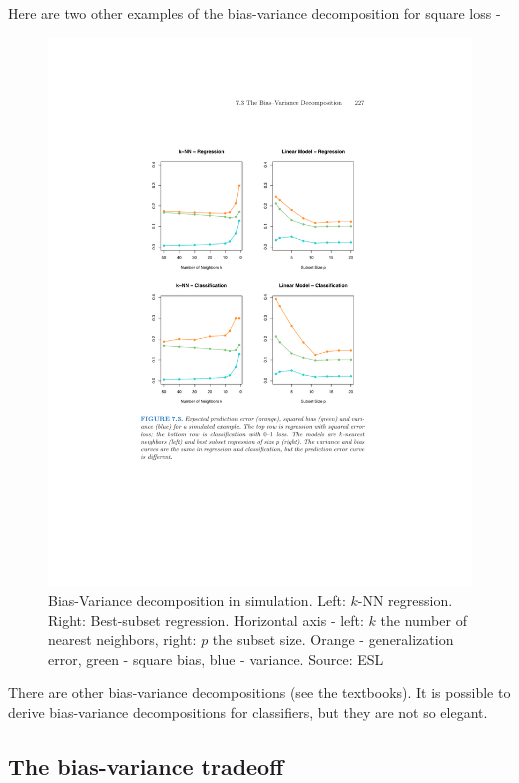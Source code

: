 Here are two other examples of the bias-variance decomposition for square loss - 
\begin{figure}[H]
  \centering
  \includegraphics[width=5in]{esl_bias_variance_regression.pdf}
  \caption{Bias-Variance decomposition in simulation. Left: $k$-NN regression. Right:
    Best-subset regression. Horizontal axis - left: $k$ the number of nearest
    neighbors, right: $p$ the subset size. Orange - generalization error, green
    - square bias, blue - variance.
  Source: ESL}
\end{figure}


There are other bias-variance decompositions (see the textbooks). It is possible
to derive bias-variance decompositions for classifiers, but they are not so
elegant. 


\subsection{The bias-variance tradeoff}

